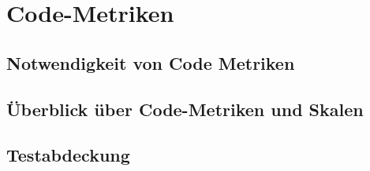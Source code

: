 \section{Code-Metriken}
        \subsection{Notwendigkeit von Code Metriken}
        \subsection{Überblick über Code-Metriken und Skalen}
        \subsection{Testabdeckung}